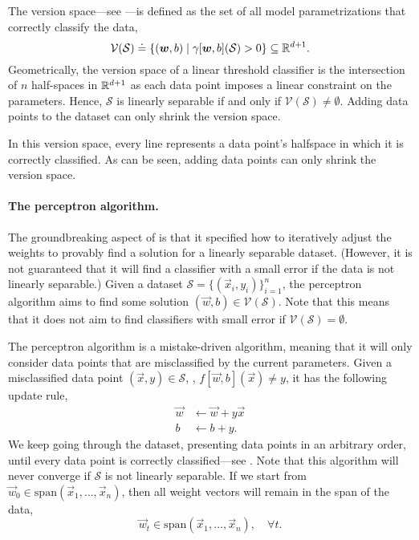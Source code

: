 The version space---see ---is defined as the set of all model
parametrizations that correctly classify the data, \[
    \mathcal{V}(\mathcal{S}) \doteq \{ (\bm{w}, b) \mid \gamma[\bm{w}, b](\mathcal{S}) > 0 \} \subseteq \mathbb{R}^{d+1}.
\]
Geometrically, the version space of a linear threshold classifier is the intersection of $n$
half-spaces in $\mathbb{R}^{d+1}$ as each data point imposes a linear constraint on the parameters. Hence,
$\mathcal{S}$ is linearly separable if and only if $\mathcal{V}(\mathcal{S}) \neq \emptyset$.
Adding data points to the dataset can only shrink the version space.

\begin{marginfigure}
    \centering
    \caption{In this version space, every line represents a data point's halfspace in which it is correctly classified. As can be seen, adding data points can only shrink the version space.}
    \label{fig:version-space}
\end{marginfigure}

\paragraph{The perceptron algorithm.} The groundbreaking aspect of \citep{rosenblatt1958perceptron} is that it specified how to
iteratively adjust the weights to provably find a solution for a linearly separable
dataset.
(However, it is not guaranteed that it will find a classifier with a small error if the data is not
linearly separable.) Given a dataset $\mathcal{S} = \{ (\vec{x}_i,y_i) \}_{i=1}^n$, the perceptron
algorithm aims to find some solution $(\vec{w},b) \in \mathcal{V}(\mathcal{S})$. Note that this
means that it does not aim to find classifiers with small error if $\mathcal{V}(\mathcal{S}) =
    \emptyset$.

The perceptron algorithm is a mistake-driven algorithm, meaning that it will only consider data
points that are misclassified by the current parameters. Given a misclassified data point
$(\vec{x}, y) \in \mathcal{S}$, \ie, $f[\vec{w},b](\vec{x}) \neq y$, it has the following update
rule,
\begin{align*}
    \vec{w} & \gets \vec{w} + y \vec{x} \\
    b       & \gets b + y.
\end{align*}
We keep going through the dataset, presenting data points in an arbitrary order, until every data point is correctly classified---see
. Note that this algorithm will never converge if $\mathcal{S}$ is not linearly
separable. If we start from $\vec{w}_0 \in \mathrm{span}(\vec{x}_1, \ldots, \vec{x}_n)$, then all weight vectors will remain in the span of the data, \[
    \vec{w}_t \in \mathrm{span}(\vec{x}_1, \ldots, \vec{x}_n), \quad \forall t.
\]

